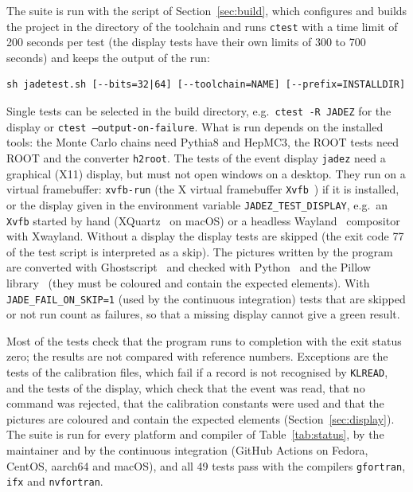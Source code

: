 The suite is run with the script of Section~\ref{sec:build}, which configures and builds the project in the directory of the toolchain and runs \texttt{ctest}
with a time limit of 200 seconds per test (the display tests have their own limits of 300 to 700 seconds) and keeps the output of the run:
\begin{lstlisting}
sh jadetest.sh [--bits=32|64] [--toolchain=NAME] [--prefix=INSTALLDIR]
\end{lstlisting}
Single tests can be selected in the build directory, e.g.\ \texttt{ctest -R JADEZ} for the display or \texttt{ctest --output-on-failure}.
What is run depends on the installed tools: the Monte Carlo chains need Pythia8 and HepMC3, the ROOT tests need ROOT and the converter \texttt{h2root}.
The tests of the event display \texttt{jadez} need a graphical (X11) display, but must not open windows on a desktop. They run on a
virtual framebuffer: \texttt{xvfb-run} (the X virtual framebuffer \texttt{Xvfb}~\cite{Xvfb:web}) if it is installed, or the display
given in the environment variable \texttt{JADEZ\_\allowbreak{}TEST\_\allowbreak{}DISPLAY}, e.g.\ an \texttt{Xvfb} started by hand (XQuartz~\cite{XQuartz:web}
on macOS) or a headless Wayland~\cite{Wayland:web} compositor with Xwayland. Without a display the display tests are skipped (the exit code 77 of the test script is
interpreted as a skip). The pictures written by the program are converted with Ghostscript~\cite{Ghostscript:web} and checked with Python~\cite{Python:web} and the
Pillow library~\cite{Pillow:web} (they must be coloured and contain the expected elements). With \texttt{JADE\_\allowbreak{}FAIL\_\allowbreak{}ON\_\allowbreak{}SKIP=1}
(used by the continuous integration) tests that are skipped or not run count as failures, so that a missing display cannot give a green result.

Most of the tests check that the program runs to completion with the exit status zero; the results are not compared with reference numbers.
Exceptions are the tests of the calibration files, which fail if a record is not recognised by \texttt{KLREAD}, and the tests of the display, which check that
the event was read, that no command was rejected, that the calibration constants were used and that the pictures are coloured and contain the expected elements
(Section~\ref{sec:display}). The suite is run for every platform and compiler of Table~\ref{tab:status}, by the maintainer and by the continuous
integration (GitHub Actions on Fedora, CentOS, aarch64 and macOS), and all 49 tests pass with the compilers \texttt{gfortran}, \texttt{ifx} and
\texttt{nvfortran}.

